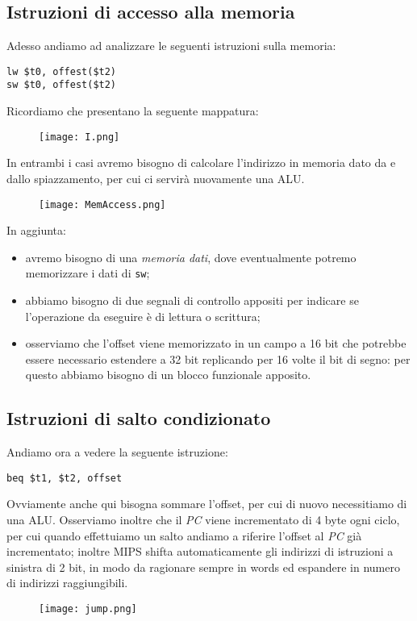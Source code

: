 \subsection{Istruzioni di accesso alla memoria}
Adesso andiamo ad analizzare le seguenti istruzioni sulla memoria:
\begin{verbatim}
lw $t0, offest($t2)
sw $t0, offest($t2)
\end{verbatim}
Ricordiamo che presentano la seguente mappatura:
\begin{figure}[H]
	\centering
	\texttt{[image: I.png]}
\end{figure}
In entrambi i casi avremo bisogno di calcolare l'indirizzo in memoria dato da  e dallo spiazzamento, per cui ci servirà nuovamente una ALU.
\begin{figure}[H]
	\centering
	\texttt{[image: MemAccess.png]}
\end{figure}
In aggiunta:
\begin{itemize}
	\item avremo bisogno di una \emph{memoria dati}, dove eventualmente potremo memorizzare i dati di \texttt{sw};
	\item abbiamo bisogno di due segnali di controllo appositi per indicare se l'operazione da eseguire è di lettura o scrittura;
	\item osserviamo che l'offset viene memorizzato in un campo a 16 bit che potrebbe essere necessario estendere a 32 bit replicando per 16 volte il bit di segno: per questo abbiamo bisogno di un blocco funzionale apposito.
\end{itemize}

\subsection{Istruzioni di salto condizionato}
Andiamo ora a vedere la seguente istruzione:
\begin{verbatim}
beq $t1, $t2, offset
\end{verbatim}
Ovviamente anche qui bisogna sommare l'offset, per cui di nuovo necessitiamo di una ALU. Osserviamo inoltre che il \emph{PC} viene incrementato di 4 byte ogni ciclo, per cui quando effettuiamo un salto andiamo a riferire l'offset al \emph{PC} già incrementato; inoltre MIPS shifta automaticamente gli indirizzi di istruzioni a sinistra di 2 bit, in modo da ragionare sempre in words ed espandere in numero di indirizzi raggiungibili.
\begin{figure}[H]
	\centering
	\texttt{[image: jump.png]}
\end{figure}


